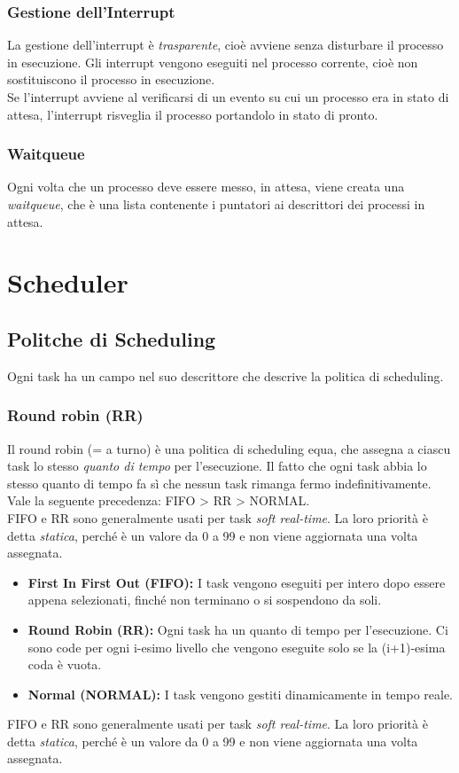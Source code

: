 \documentclass[10pt,a4paper]{article}
\begin{document}
    \subsubsection{Gestione dell'Interrupt}
    La gestione dell'interrupt è \emph{trasparente}, cioè avviene senza disturbare il processo in esecuzione. Gli interrupt vengono eseguiti nel processo corrente, cioè non sostituiscono il processo in esecuzione.\\
    Se l'interrupt avviene al verificarsi di un evento su cui un processo era in stato di attesa, l'interrupt risveglia il processo portandolo in stato di pronto.
    \subsubsection{Waitqueue}
    Ogni volta che un processo deve essere messo, in attesa, viene creata una \emph{waitqueue}, che è una lista contenente i puntatori ai descrittori dei processi in attesa.
    \section{Scheduler}
    \subsection{Politche di Scheduling}
    Ogni task ha un campo nel suo descrittore che descrive la politica di scheduling.
    \subsubsection{Round robin (RR)}
    Il round robin (= a turno) è una politica di scheduling equa, che assegna a ciascu task lo stesso \emph{quanto di tempo} per l'esecuzione. Il fatto che ogni task abbia lo stesso quanto di tempo fa sì che nessun task rimanga fermo indefinitivamente.\\
    Vale la seguente precedenza: FIFO > RR > NORMAL.\\
    FIFO e RR sono generalmente usati per task \emph{soft real-time}. La loro priorità è detta \emph{statica}, perché è un valore da 0 a 99 e non viene aggiornata una volta assegnata.
    \begin{itemize}
        \item \textbf{First In First Out (FIFO):}
        I task vengono eseguiti per intero dopo essere appena selezionati, finché non terminano o si sospendono da soli.
        \item \textbf{Round Robin (RR):} Ogni task ha un quanto di tempo per l'esecuzione. Ci sono code per ogni i-esimo livello che vengono eseguite solo se la (i+1)-esima coda è vuota.
        \item \textbf{Normal (NORMAL):} I task vengono gestiti dinamicamente in tempo reale.
    \end{itemize}
    FIFO e RR sono generalmente usati per task \emph{soft real-time}. La loro priorità è detta \emph{statica}, perché è un valore da 0 a 99 e non viene aggiornata una volta assegnata.
\end{document}
